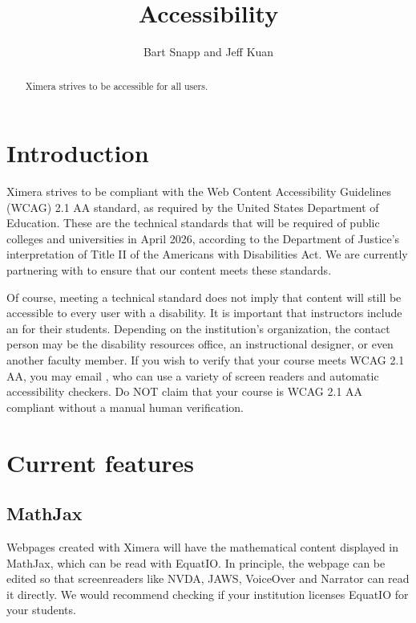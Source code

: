 \documentclass{ximera}
\author{Bart Snapp and Jeff Kuan}
\title{Accessibility}
\begin{document}
\begin{abstract}
Ximera strives to be accessible for all users.
\end{abstract}
\maketitle

\section{Introduction}
Ximera strives to be compliant with the Web Content Accessibility Guidelines (WCAG) 2.1 AA standard, as required by the United States
Department of Education. These are the technical standards that will be required of public colleges and universities in April 2026, 
according to the Department of Justice's interpretation of Title II of the Americans with Disabilities Act. 
We are currently partnering with  
to ensure that our content meets these standards.

Of course, meeting a technical standard does not imply that content will still be accessible to every user with a disability. 
It is important that instructors include an  for their
students. Depending on the institution's organization, the contact person may be the disability resources office, an instructional designer, 
or even another faculty member. If you wish to verify that your course meets WCAG 2.1 AA, you may email ,
who can use a variety of screen readers and automatic accessibility checkers. Do NOT claim that your course is WCAG 2.1 AA compliant
without a manual human verification. 

\section{Current features}

\subsection{MathJax}
Webpages created with Ximera will have the mathematical content displayed in MathJax, which can be read with EquatIO. In principle, the webpage 
can be edited so that screenreaders like NVDA, JAWS, VoiceOver and Narrator can read it directly. We would recommend checking if your
institution licenses EquatIO for your students. 
\end{document}
